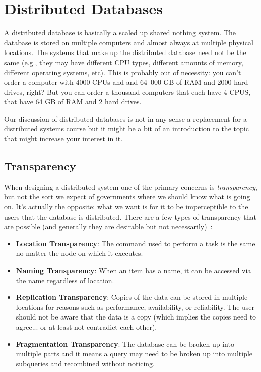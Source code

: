 




\section*{Distributed Databases}

A distributed database is basically a scaled up shared nothing system. The database is stored on multiple computers and almost always at multiple physical locations. The systems that make up the distributed database need not be the same (e.g., they may have different CPU types, different amounts of memory, different operating systems, etc). This is probably out of necessity: you can't order a computer with 4000 CPUs and and 64~000 GB of RAM and 2000 hard drives, right? But you can order a thousand computers that each have 4 CPUS, that have 64 GB of RAM and 2 hard drives.

Our discussion of distributed databases is not in any sense a replacement for a distributed systems course but it might be a bit of an introduction to the topic that might increase your interest in it. 


\subsection*{Transparency}
When designing a distributed system one of the primary concerns is \textit{transparency}, but not the sort we expect of governments where we should know what is going on. It's actually the opposite: what we want is for it to be imperceptible to the users that the database is distributed. There are a few types of transparency that are possible (and generally they are desirable but not necessarily)~\cite{fds}:

\begin{itemize}
	\item \textbf{Location Transparency}: The command used to perform a task is the same no matter the node on which it executes.
	\item \textbf{Naming Transparency}: When an item has a name, it can be accessed via the name regardless of location.
	\item \textbf{Replication Transparency}: Copies of the data can be stored in multiple locations for reasons such as performance, availability, or reliability. The user should not be aware that the data is a copy (which implies the copies need to agree... or at least not contradict each other).
	\item \textbf{Fragmentation Transparency}: The database can be broken up into multiple parts and it means a query may need to be broken up into multiple subqueries and recombined without noticing. 
\end{itemize}

